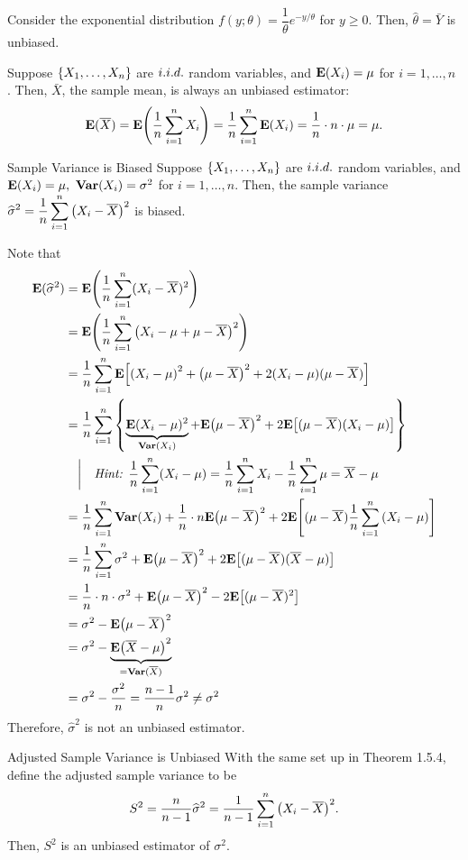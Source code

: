 \begin{eg}
	Consider the exponential distribution $f(y;\theta)=\dfrac{1}{\theta}e^{-y/\theta}$ for $y\geq0$. Then, $\hat\theta=\bar Y$ is unbiased. 	
\end{eg}
\begin{rmk}
	Suppose $\qty{X_1,\dots,X_n}$ are $i.i.d.$ random variables, and $\vb{E}(X_i)=\mu$ for $i=1,\dots,n$	. Then, $\bar X$, the sample mean, is always an unbiased estimator: \[\vb{E}(\overline X)=\vb{E}\qty(\dfrac{1}{n}\sum_{i=1}^nX_i)=\dfrac{1}{n}\sum_{i=1}^n\vb{E}(X_i)=\dfrac{1}{n}\cdot n\cdot \mu=\mu.\]
\end{rmk}
\begin{thm}{Sample Variance is Biased}
	Suppose $\qty{X_1,\dots,X_n}$ are $i.i.d.$ random variables, and $\vb{E}(X_i)=\mu,\ \vb{Var}(X_i)=\sigma^2$ for $i=1,\dots,n$. Then, the sample variance $\displaystyle\widehat\sigma^2=\dfrac{1}{n}\sum_{i=1}^n\qty(X_i-\overline X)^2$ is biased. 
\end{thm}
\begin{prf}
	Note that \begin{align*}
		\E(\hat\sigma^2)&=\E\qty(\dfrac{1}{n}\sum_{i=1}^n(X_i-\bar X)^2)\\&=\E\qty(\dfrac{1}{n}\sum_{i=1}^n\qty(X_i-\mu+\mu-\bar{X})^2)\\&=\dfrac{1}{n}\sum_{i=1}^n\E\qty[\qty(X_i-\mu)^2+\qty(\mu-\bar X)^2+2\qty(X_i-\mu)(\mu-\bar X)]\\&=\dfrac{1}{n}\sum_{i=1}^n\qty{\underbrace{\E(X_i-\mu)^2}_{\Var(X_i)}+\E\qty(\mu-\bar X)^2+2\E\qty[(\mu-\bar X)(X_i-\mu)]}\\&\ \ \ \bigg|\quad\textit{Hint: }\dfrac{1}{n}\sum_{i=1}^n(X_i-\mu)=\dfrac{1}{n}\sum_{i=1}^nX_i-\dfrac{1}{n}\sum_{i=1}^n\mu=\bar X-\mu\\&=\dfrac{1}{n}\sum_{i=1}^n\Var(X_i)+\dfrac{1}{n}\cdot n\E\qty(\mu-\bar{X})^2+2\E\qty[(\mu-\bar X)\dfrac{1}{n}\sum_{i=1}^n\qty(X_i-\mu)]\\&=\dfrac{1}{n}\sum_{i=1}^n\sigma^2+\E\qty(\mu-\bar X)^2+2\E\qty[(\mu-\bar X)(\bar X-\mu)]\\&=\dfrac{1}{n}\cdot n\cdot\sigma^2+\E\qty(\mu-\bar X)^2-2\E\qty[(\mu-\bar X)^2]\\&=\sigma^2-\E\qty(\mu-\bar X)^2\\&=\sigma^2-\underbrace{\E\qty(\bar X-\mu)^2}_{=\Var(\bar X)}\\&=\sigma^2-\dfrac{\sigma^2}{n}=\dfrac{n-1}{n}\sigma^2\neq\sigma^2
	\end{align*}
	Therefore, $\hat\sigma^2$ is not an unbiased estimator. 
\end{prf}
\begin{thm}{Adjusted Sample Variance is Unbiased}
	With the same set up in Theorem 1.5.4, define the adjusted sample variance to be \[S^2=\dfrac{n}{n-1}\widehat\sigma^2=\dfrac{1}{n-1}\sum_{i=1}^n\qty(X_i-\overline X)^2.\] Then, $S^2$ is an unbiased estimator of $\sigma^2$.
\end{thm}

